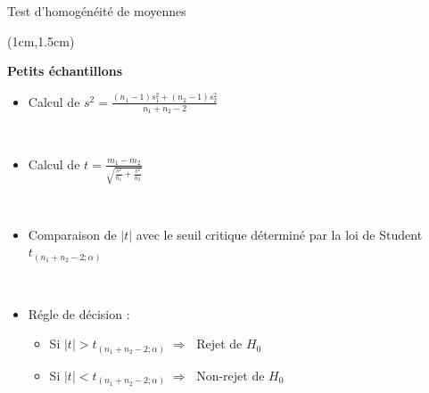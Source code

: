 \documentclass{beamer}
\begin{document}

\begin{frame}{Test d'homogénéité de moyennes}
\begin{textblock*}{\textwidth}(1cm,1.5cm)

\begin{center}{\bf \Large Petits échantillons } \end{center}

\vspace{0.2cm}
\begin{itemize}
\item Calcul  de $\displaystyle s^2=\frac{(n_1-1)s_1^2+(n_2-1)s_2^2}{n_1+n_2-2}$

\
\item Calcul de $\displaystyle t= \frac{m_1-m_2}{\sqrt{\frac{s^2}{n_1}+\frac{s^2}{n_2}} }$

\
\item Comparaison de $|t|$ avec le seuil critique déterminé par la loi de Student $t_{(n_1+n_2-2;\alpha)}$ 

\
\item Régle de décision :
\begin{itemize}
\item Si $|t| > t_{(n_1+n_2-2;\alpha)} \; \Rightarrow \; $ Rejet de $H_0$
\item Si $|t| < t_{(n_1+n_2-2;\alpha)} \; \Rightarrow \; $ Non-rejet de $H_0$
\end{itemize}

\end{itemize}

\end{textblock*}
\end{frame}



\end{document}
